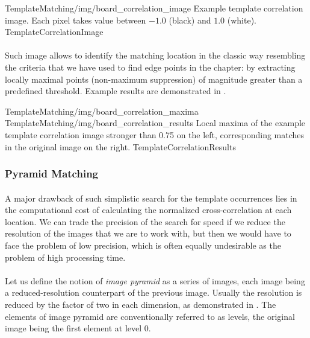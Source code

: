 \oneFigure
{TemplateMatching/img/board_correlation_image}
{Example template correlation image. Each pixel takes value between $-1.0$ (black) and $1.0$ (white).}
{TemplateCorrelationImage}
{\basicWidth}

\paragraph*{}
Such image allows to identify the matching location in the classic way resembling the criteria that we have used to find edge points in the  chapter: by extracting locally maximal points (non-maximum suppression) of magnitude greater than a predefined threshold. Example results are demonstrated in .

\twoFigures
{TemplateMatching/img/board_correlation_maxima}
{TemplateMatching/img/board_correlation_results}
{Local maxima of the example template correlation image stronger than 0.75 on the left, corresponding matches in the original image on the right.}
{TemplateCorrelationResults}
{\basicWidth}

\subsubsection{Pyramid Matching}

\paragraph*{}
A major drawback of such simplistic search for the template occurrences lies in the computational cost of calculating the normalized cross-correlation at each location. We can trade the precision of the search for speed if we reduce the resolution of the images that we are to work with, but then we would have to face the problem of low precision, which is often equally undesirable as the problem of high processing time.

\paragraph*{}
Let us define the notion of \textit{image pyramid} as a series of images, each image being a reduced-resolution counterpart of the previous image. Usually the resolution is reduced by the factor of two in each dimension, as demonstrated in . The elements of image pyramid are conventionally referred to as levels, the original image being the first element at level 0.

